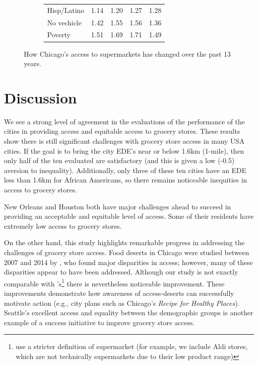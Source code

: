 \documentclass[final,3p,times,onecolumn,sort&compress]{elsarticle}
\begin{document}
\begin{figure}[]
\begin{subfigure}{0.5\textwidth}
\begin{tabular}{lllll}
            Hisp/Latino & 1.14          & 1.20          & 1.27          & 1.28          \\
            No vechicle & 1.42          & 1.55          & 1.56          & 1.36          \\
            Poverty     & 1.51          & 1.69          & 1.71          & 1.49          \\ 
            \hline
        \end{tabular}
    \end{subfigure}
    \caption{
    How Chicago's access to supermarkets has changed over the past 13 years.
    }
    \label{fig:chicago}
\end{figure}

\section{Discussion}
We see a strong level of agreement in the evaluations of the performance of the cities in providing access and equitable access to grocery stores.
These results show there is still significant challenges with grocery store access in many USA cities.
If the goal is to bring the city EDE's near or below 1.6km (1-mile), then only half of the ten evaluated are satisfactory (and this is given a low (-0.5) aversion to inequality).
Additionally, only three of these ten cities have an EDE less than 1.6km for African Americans, so there remains noticeable inequities in access to grocery stores.

New Orleans and Houston both have major challenges ahead to succeed in providing an acceptable and equitable level of access.
Some of their residents have extremely low access to grocery stores.

On the other hand, this study highlights remarkable progress in addressing the challenges of grocery store access.
Food deserts in Chicago were studied between 2007 and 2014 by \cite{Kolak2018-az}, who found major disparities in access; however, many of these disparities appear to have been addressed.
Although our study is not exactly comparable with \cite{Kolak2018-az}'s\footnote{\cite{Kolak2018-az} use a stricter definition of supermarket (for example, we include Aldi stores, which are not technically supermarkets due to their low product range)} there is nevertheless noticeable improvement.
These improvements demonstrate how awareness of access-deserts can successfully motivate action (e.g., city plans such as Chicago's \textit{Recipe for Healthy Places}).
Seattle's excellent access and equality between the demographic groups is another example of a success initiative to improve grocery store access.
\end{document}
